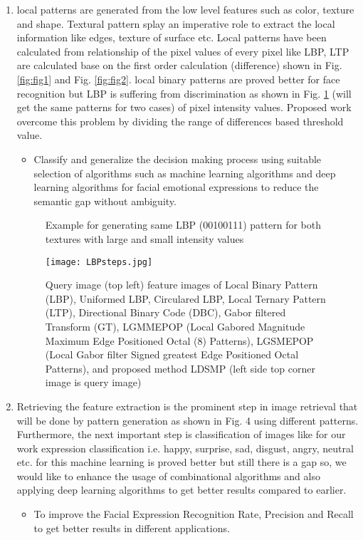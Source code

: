 \documentclass[review]{elsarticle}
\begin{document}
\begin{enumerate}
	\item local patterns are generated from the low level features such as color, texture and shape. Textural pattern splay an imperative role to extract the local information like edges, texture of surface etc. Local patterns have been calculated from relationship of the pixel values of every pixel like LBP, LTP are calculated base on the first order calculation (difference) shown in Fig. \ref{fig:fig1} and Fig. \ref{fig:fig2}. local binary patterns are proved better for face recognition but LBP is suffering from discrimination as shown in Fig. \ref{fig:lbppattern} (will get the same patterns for two cases) of pixel intensity values. Proposed work overcome this problem by dividing the range of differences based threshold value.
	\begin{itemize}
		\item Classify and generalize the decision making process using suitable selection of algorithms such as machine learning algorithms and deep learning algorithms for facial emotional expressions to reduce the semantic gap without ambiguity.
	\end{itemize}	
	\begin{figure}
		\centering
		\caption{Example for generating same LBP (00100111) pattern for both textures with large and small intensity values}
		\label{fig:lbppattern}
	\end{figure}
	\begin{figure}
		\centering
		\texttt{[image: LBPsteps.jpg]}
		\caption{Query image (top left) feature images of Local Binary Pattern (LBP), Uniformed LBP, Circulared LBP, Local Ternary Pattern (LTP), Directional Binary Code (DBC), Gabor filtered Transform (GT), LGMMEPOP (Local Gabored Magnitude Maximum Edge Positioned Octal (8) Patterns), LGSMEPOP (Local Gabor filter Signed greatest Edge Positioned Octal Patterns), and proposed method LDSMP (left side top corner image is query image)}
		\label{fig:lbpltp}
	\end{figure}
	
	
	\item Retrieving the feature extraction is the prominent step in image retrieval that will be done by pattern generation as shown in Fig. 4 using different patterns. Furthermore, the next important step is classification of images like for our work expression classification i.e. happy, surprise, sad, disgust, angry, neutral etc. for  this machine learning is proved better but still there is a gap so, we would like to enhance the usage of combinational algorithms and also applying deep learning algorithms to get better results compared to earlier.
	\begin{itemize}
		\item To improve the Facial Expression Recognition Rate, Precision and Recall to get better results in different applications.	
	\end{itemize}
	
	
\end{enumerate}
\end{document}
